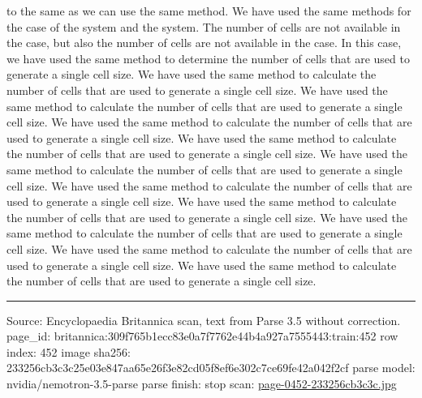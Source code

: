 \documentclass[10pt]{article}
\begin{document}
to the same as we can use the same method. We have used the same methods for the case of the system and the system. The number of cells are not available in the case, but also the number of cells are not available in the case. In this case, we have used the same method to determine the number of cells that are used to generate a single cell size. We have used the same method to calculate the number of cells that are used to generate a single cell size. We have used the same method to calculate the number of cells that are used to generate a single cell size. We have used the same method to calculate the number of cells that are used to generate a single cell size. We have used the same method to calculate the number of cells that are used to generate a single cell size. We have used the same method to calculate the number of cells that are used to generate a single cell size. We have used the same method to calculate the number of cells that are used to generate a single cell size. We have used the same method to calculate the number of cells that are used to generate a single cell size. We have used the same method to calculate the number of cells that are used to generate a single cell size. We have used the same method to calculate the number of cells that are used to generate a single cell size. We have used the same method to calculate the number of cells that are used to generate a single cell size.

\vfill\par\noindent\rule{\linewidth}{0.4pt}\par
{\scriptsize\color{gray}\noindent Source: Encyclopaedia Britannica scan, text from Parse 3.5 without correction. page\_id: britannica:309f765b1ecc83e0a7f7762e44b4a927a7555443:train:452 \quad row index: 452 \quad image sha256: 233256cb3c3c25e03e847aa65e26f3e82cd05f8ef6e302c7ce69fe42a042f2cf \quad parse model: nvidia/nemotron-3.5-parse \quad parse finish: stop \quad scan: \href{../scans/page-0452-233256cb3c3c.jpg}{page-0452-233256cb3c3c.jpg}\par}
\end{document}
